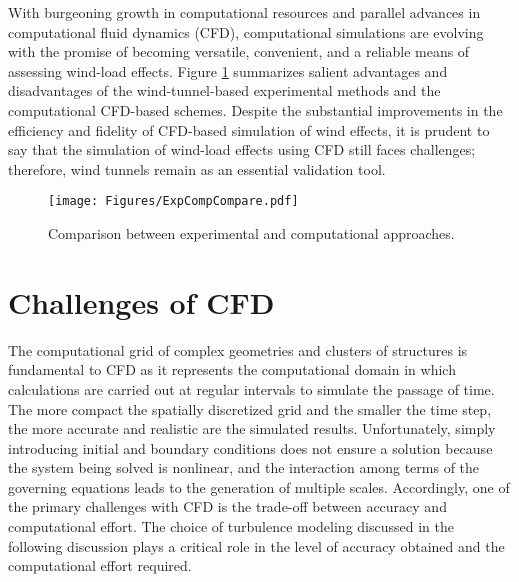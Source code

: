 With burgeoning growth in computational resources and parallel advances in computational fluid dynamics (CFD), computational simulations are evolving with the promise of becoming versatile, convenient, and a reliable means of assessing wind-load effects. Figure \ref{fig:cfdWind_ExpCompCompare} summarizes salient advantages and disadvantages of the wind-tunnel-based experimental methods and the computational CFD-based schemes. Despite the substantial improvements in the efficiency and fidelity of CFD-based simulation of wind effects, it is prudent to say that the simulation of wind-load effects using CFD still faces challenges; therefore, wind tunnels remain as an essential validation tool.

\begin{figure}[htb]
    \centering
    \texttt{[image: Figures/ExpCompCompare.pdf]}
    \caption{Comparison between experimental and computational approaches.}
    \label{fig:cfdWind_ExpCompCompare}
\end{figure}

 
\section{Challenges of CFD}
\label{sec:resp_cfd_wind_challenges}

The computational grid of complex geometries and clusters of structures is fundamental to CFD as it represents the computational domain in which calculations are carried out at regular intervals to simulate the passage of time. The more compact the spatially discretized grid and the smaller the time step, the more accurate and realistic are the simulated results. Unfortunately, simply introducing initial and boundary conditions does not ensure a solution because the system being solved is nonlinear, and the interaction among terms of the governing equations leads to the generation of multiple scales. Accordingly, one of the primary challenges with CFD is the trade-off between accuracy and computational effort. The choice of turbulence modeling discussed in the following discussion plays a critical role in the level of accuracy obtained and the computational effort required. 

